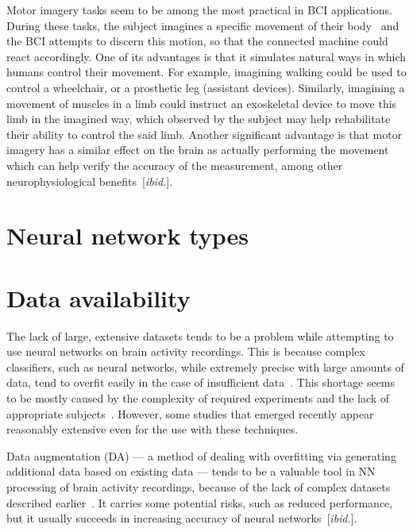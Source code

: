\documentclass[english,BP]{thesiskiv}
\begin{document}
	Motor imagery tasks seem to be among the most practical in BCI applications. During these tasks, the subject imagines a specific movement of their body~\cite{craik:dl:eeg:rev:19} and the BCI attempts to discern this motion, so that the connected machine could react accordingly.
	One of its advantages is that it simulates natural ways in which humans control their movement.	For example, imagining walking could be used to control a wheelchair, or a prosthetic leg (assistant devices). Similarly, imagining a movement of muscles in a limb could instruct an exoskeletal device to move this limb in the imagined way, which observed by the subject may help rehabilitate their ability to control the said limb.
	Another significant advantage is that motor imagery has a similar effect on the brain as actually performing the movement~\cite{pfurtscheller:mi:01} which can help verify the accuracy of the measurement, among other neurophysiological benefits~[\emph{ibid.}].


	\section{Neural network types}


	\section{Data availability}

	The lack of large, extensive datasets tends to be a problem while attempting to use neural networks on brain activity recordings. This is because complex classifiers, such as neural networks, while extremely precise with large amounts of data, tend to overfit easily in the case of insufficient data~\cite{domingos:ml:12}. This shortage seems to be mostly caused by the complexity of required experiments and the lack of appropriate subjects~\cite{he:da:21}. However, some studies that emerged recently appear reasonably extensive even for the use with these techniques.

	Data augmentation (DA) --- a method of dealing with overfitting via generating additional data based on existing data --- tends to be a valuable tool in NN processing of brain activity recordings, because of the lack of complex datasets described earlier~\cite{he:da:21}. It carries some potential risks, such as reduced performance, but it usually succeeds in increasing accuracy of neural networks~[\emph{ibid.}].
\end{document}
